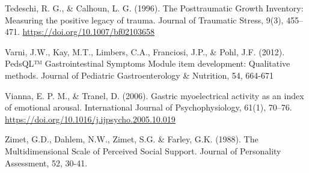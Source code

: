 \documentclass[]{book}
\begin{document}
Tedeschi, R. G., \& Calhoun, L. G. (1996). The Posttraumatic Growth Inventory: Measuring the positive legacy of trauma. Journal of Traumatic Stress, 9(3), 455--471. \url{https://doi.org/10.1007/bf02103658}

Varni, J.W., Kay, M.T., Limbers, C.A., Franciosi, J.P., \& Pohl, J.F. (2012). PedsQL™ Gastrointestinal Symptoms Module item development: Qualitative methods. Journal of Pediatric Gastroenterology \& Nutrition, 54, 664-671

Vianna, E. P. M., \& Tranel, D. (2006). Gastric myoelectrical activity as an index of emotional arousal. International Journal of Psychophysiology, 61(1), 70--76. \url{https://doi.org/10.1016/j.ijpsycho.2005.10.019}

Zimet, G.D., Dahlem, N.W., Zimet, S.G. \& Farley, G.K. (1988). The Multidimensional Scale of
Perceived Social Support. Journal of Personality Assessment, 52, 30-41.
\end{document}
